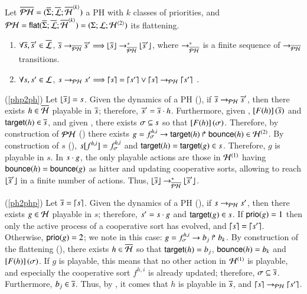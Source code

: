 \begin{theorem}
\label{th:bisimPHP}
  Let $\ov{\PH} = (\ov{\PHs}; \ov{\PHl}; \ov{\PHa}^{\angles{k}})$ a PH with $k$ classes of priorities,
  and $\PH = \PHflat(\ov{\PHs}; \ov{\PHl}; \ov{\PHa}^{\angles{k}}) = (\PHs; \PHl; \PHa^{\angles{2}})$ its flattening.
  \begin{enumerate}
    \item \label{php2ph} $\forall \os, \os' \in \ov{\PHl}$,
      $\os \PHPtrans[\oPH] \os' \Longrightarrow \flats{\os} \PHPtrans[\oPH]^* \flats{\os'}$,
      where $\PHPtrans[\oPH]^*$ is a finite sequence of $\PHPtrans[\oPH]$ transitions.
    \item \label{ph2php} $\forall s, s' \in \PHl$,
      $s \PHPtrans s' \Longrightarrow \unflats{s} = \unflats{s'} \vee
      \unflats{s} \PHPtrans \unflats{s'} \enspace.$
  \end{enumerate}
\end{theorem}
%
\begin{proofbisimPHP}
  (\ref{php2ph}) Let $\flats{\os} = s$.
    Given the dynamics of a PH (), if $\os \PHPtrans[\PH] \os'$,
    then there exists $h \in \ov{\PHh}$ playable in $\os$;
    therefore, $\os' = \os \PHplay h$.
    Furthermore, given , $\Fsem{\Fop{h}}{\os}$ and $\target{h} \in \os$,
    and given , there exists $\mysigma \subseteq s$ so that $\Fsem{\Fop{h}}{\mysigma}$.
    Therefore, by construction of $\PH$ () there exists
    $g = \PHhit{f^{h,i}_\mysigma}{\target{h}}{\bounce{h}} \in \PHh^{(2)}$.
    By construction of $s$ (), $\PHget{s}{f^{h,i}} = f^{h,i}_\mysigma$ and $\target{h} = \target{g} \in s$.
    Therefore, $g$ is playable in $s$.
    In $s \PHplay g$, the only playable actions are those in $\PHh^{(1)}$ having $\bounce{h} = \bounce{g}$ as hitter
    and updating cooperative sorts, allowing to reach $\flats{\os'}$ in a finite number of actions.
    Thus, $\flats{\os} \PHPtrans[\oPH]^* \flats{\os'}$.
  
  (\ref{ph2php}) Let $\os = \unflats{s}$.
    Given the dynamics of a PH (), if $s \PHPtrans s'$,
    then there exists $g \in \PHh$ playable in $s$; therefore, $s' = s \PHplay g$ and $\target{g} \in s$.
    If $\prio(g) = 1$ then only the active process of a cooperative sort has evolved, and $\unflats{s} = \unflats{s'}$.
    Otherwise, $\prio(g) = 2$; we note in this case: $g = \PHhit{f^{h,i}_\mysigma}{b_j}{b_k}$.
    By construction of the flattening (), there exists $h \in \ov{\PHh}$ so that
    $\target{h} = b_j$, $\bounce{h} = b_k$ and $\Fsem{\Fop{h}}{\mysigma}$.
    If $g$ is playable, this means that no other action in $\PHh^{(1)}$ is playable, and especially the cooperative sort
    $f^{h,i}$ is already updated; therefore, $\mysigma \subseteq \os$.
    Furthermore, $b_j \in \os$.
    Thus, by , it comes that $h$ is playable in $\os$,
    and $\unflats{s} \PHPtrans \unflats{s'}$.
\end{proofbisimPHP}

